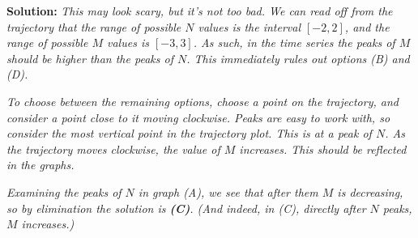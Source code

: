 \documentclass[a4paper,12pt]{article}
\begin{document}
\textbf{Solution:} \emph{This may look scary, but it's not too bad. We can read off from the trajectory that the range of possible $N$ values is the interval $[-2,2]$, and the range of possible $M$ values is $[-3,3]$. As such, in the time series the peaks of $M$ should be higher than the peaks of $N$. This immediately rules out options (B) and (D).}

\emph{To choose between the remaining options, choose a point on the trajectory, and consider a point close to it moving clockwise. Peaks are easy to work with, so consider the most vertical point in the trajectory plot. This is at a peak of $N$. As the trajectory moves clockwise, the value of $M$ increases. This should be reflected in the graphs.}

\emph{Examining the peaks of $N$ in graph (A), we see that after them $M$ is decreasing, so by elimination the solution is \textbf{(C)}. (And indeed, in (C), directly after $N$ peaks, $M$ increases.)}
\end{document}
